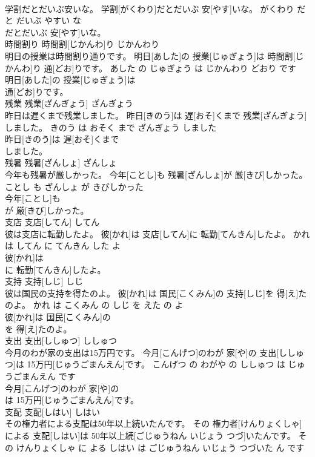 \documentclass[8pt]{extreport}
\begin{document}
\begin{CJK}{UTF8}{min}
\\	学割だとだいぶ安いな。	学割[がくわり]だとだいぶ 安[やす]いな。	がくわり だ と だいぶ やすい な	
\\	だとだいぶ 安[やす]いな。			
\\	時間割り	時間割[じかんわ]り	じかんわり	
\\	明日の授業は時間割り通りです。	明日[あした]の 授業[じゅぎょう]は 時間割[じかんわ]り 通[どお]りです。	あした の じゅぎょう は じかんわり どおり です	
\\	明日[あした]の 授業[じゅぎょう]は
\\	通[どお]りです。			
\\	残業	残業[ざんぎょう]	ざんぎょう	
\\	昨日は遅くまで残業しました。	昨日[きのう]は 遅[おそ]くまで 残業[ざんぎょう]しました。	きのう は おそく まで ざんぎょう しました	
\\	昨日[きのう]は 遅[おそ]くまで
\\	しました。			
\\	残暑	残暑[ざんしょ]	ざんしょ	
\\	今年も残暑が厳しかった。	今年[ことし]も 残暑[ざんしょ]が 厳[きび]しかった。	ことし も ざんしょ が きびしかった	
\\	今年[ことし]も
\\	が 厳[きび]しかった。			
\\	支店	支店[してん]	してん	
\\	彼は支店に転勤したよ。	彼[かれ]は 支店[してん]に 転勤[てんきん]したよ。	かれ は してん に てんきん した よ	
\\	彼[かれ]は
\\	に 転勤[てんきん]したよ。			
\\	支持	支持[しじ]	しじ	
\\	彼は国民の支持を得たのよ。	彼[かれ]は 国民[こくみん]の 支持[しじ]を 得[え]たのよ。	かれ は こくみん の しじ を えた の よ	
\\	彼[かれ]は 国民[こくみん]の
\\	を 得[え]たのよ。			
\\	支出	支出[ししゅつ]	ししゅつ	
\\	今月のわが家の支出は15万円です。	今月[こんげつ]のわが 家[や]の 支出[ししゅつ]は 15万円[じゅうごまんえん]です。	こんげつ の わがや の ししゅつ は じゅうごまんえん です	
\\	今月[こんげつ]のわが 家[や]の
\\	は 15万円[じゅうごまんえん]です。			
\\	支配	支配[しはい]	しはい	
\\	その権力者による支配は50年以上続いたんです。	その 権力者[けんりょくしゃ]による 支配[しはい]は 50年以上続[ごじゅうねん いじょう つづ]いたんです。	その けんりょくしゃ に よる しはい は ごじゅうねん いじょう つづいた ん です	

\end{CJK}
\end{document}
